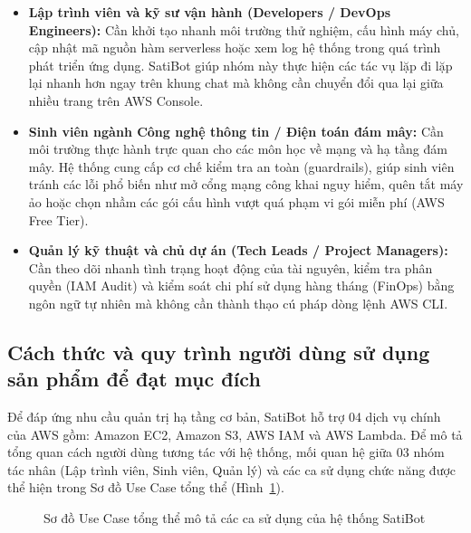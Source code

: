 \documentclass[a4paper,12pt]{article}
\begin{document}
\begin{itemize}
  \item \textbf{Lập trình viên và kỹ sư vận hành (Developers / DevOps Engineers):} Cần khởi tạo nhanh môi trường thử nghiệm, cấu hình máy chủ, cập nhật mã nguồn hàm serverless hoặc xem log hệ thống trong quá trình phát triển ứng dụng. SatiBot giúp nhóm này thực hiện các tác vụ lặp đi lặp lại nhanh hơn ngay trên khung chat mà không cần chuyển đổi qua lại giữa nhiều trang trên AWS Console.
  \item \textbf{Sinh viên ngành Công nghệ thông tin / Điện toán đám mây:} Cần môi trường thực hành trực quan cho các môn học về mạng và hạ tầng đám mây. Hệ thống cung cấp cơ chế kiểm tra an toàn (guardrails), giúp sinh viên tránh các lỗi phổ biến như mở cổng mạng công khai nguy hiểm, quên tắt máy ảo hoặc chọn nhầm các gói cấu hình vượt quá phạm vi gói miễn phí (AWS Free Tier).
  \item \textbf{Quản lý kỹ thuật và chủ dự án (Tech Leads / Project Managers):} Cần theo dõi nhanh tình trạng hoạt động của tài nguyên, kiểm tra phân quyền (IAM Audit) và kiểm soát chi phí sử dụng hàng tháng (FinOps) bằng ngôn ngữ tự nhiên mà không cần thành thạo cú pháp dòng lệnh AWS CLI.
\end{itemize}

\subsection{Cách thức và quy trình người dùng sử dụng sản phẩm để đạt mục đích}

Để đáp ứng nhu cầu quản trị hạ tầng cơ bản, SatiBot hỗ trợ 04 dịch vụ chính của AWS gồm: Amazon EC2, Amazon S3, AWS IAM và AWS Lambda. Để mô tả tổng quan cách người dùng tương tác với hệ thống, mối quan hệ giữa 03 nhóm tác nhân (Lập trình viên, Sinh viên, Quản lý) và các ca sử dụng chức năng được thể hiện trong Sơ đồ Use Case tổng thể (Hình~\ref{fig:usecase}).

\begin{figure}[H]
\centering
{}
\caption{Sơ đồ Use Case tổng thể mô tả các ca sử dụng của hệ thống SatiBot}
\label{fig:usecase}
\end{figure}
\end{document}
